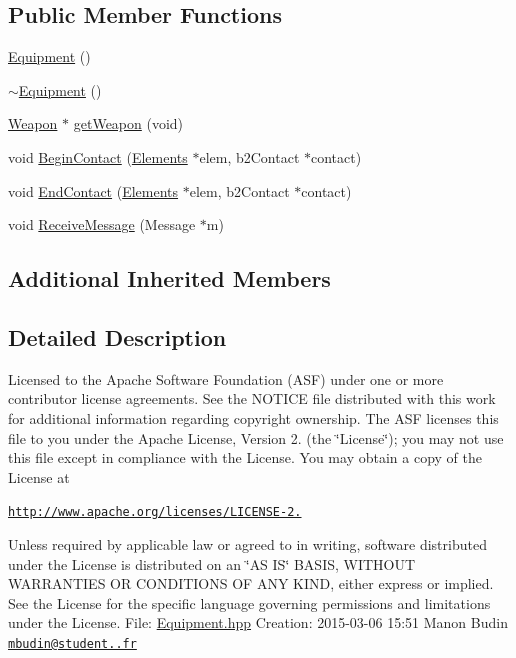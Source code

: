 \subsection*{Public Member Functions}
\begin{DoxyCompactItemize}
\item 
\hyperlink{class_equipment_a2bd67c4254f2074f4f7469f29a20e760}{Equipment} ()
\item 
\hyperlink{class_equipment_a3e7f53e57fa3004b5a4490e2c7a1fbaf}{$\sim$\-Equipment} ()
\item 
\hyperlink{class_weapon}{Weapon} $\ast$ \hyperlink{class_equipment_a54fd1c2d6cca6b4d2584eb0cf8725bd2}{get\-Weapon} (void)
\item 
void \hyperlink{class_equipment_a0c706b45578e8d01fec7b8ee1b773987}{Begin\-Contact} (\hyperlink{class_elements}{Elements} $\ast$elem, b2\-Contact $\ast$contact)
\item 
void \hyperlink{class_equipment_abda1acd976a1c33f3aa398b3a9a64555}{End\-Contact} (\hyperlink{class_elements}{Elements} $\ast$elem, b2\-Contact $\ast$contact)
\item 
void \hyperlink{class_equipment_ab195be955597ce6f64c117d675df3af4}{Receive\-Message} (Message $\ast$m)
\end{DoxyCompactItemize}
\subsection*{Additional Inherited Members}


\subsection{Detailed Description}
Licensed to the Apache Software Foundation (A\-S\-F) under one or more contributor license agreements. See the N\-O\-T\-I\-C\-E file distributed with this work for additional information regarding copyright ownership. The A\-S\-F licenses this file to you under the Apache License, Version 2. (the \char`\"{}\-License\char`\"{}); you may not use this file except in compliance with the License. You may obtain a copy of the License at

\href{http://www.apache.org/licenses/LICENSE-2.0}{\tt http\-://www.\-apache.\-org/licenses/\-L\-I\-C\-E\-N\-S\-E-\/2.}

Unless required by applicable law or agreed to in writing, software distributed under the License is distributed on an \char`\"{}\-A\-S I\-S\char`\"{} B\-A\-S\-I\-S, W\-I\-T\-H\-O\-U\-T W\-A\-R\-R\-A\-N\-T\-I\-E\-S O\-R C\-O\-N\-D\-I\-T\-I\-O\-N\-S O\-F A\-N\-Y K\-I\-N\-D, either express or implied. See the License for the specific language governing permissions and limitations under the License. File\-: \hyperlink{_equipment_8hpp}{Equipment.\-hpp} Creation\-: 2015-\/03-\/06 15\-:51 Manon Budin \href{mailto:mbudin@student.42.fr}{\tt mbudin@student..\-fr} 

